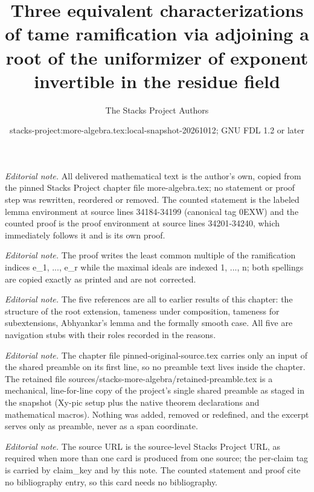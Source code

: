 \documentclass[10pt,a4paper]{amsart}
\title{Three equivalent characterizations of tame ramification via adjoining a root of the uniformizer of exponent invertible in the residue field}
\author{The Stacks Project Authors}
\date{stacks-project:more-algebra.tex:local-snapshot-20261012; GNU FDL 1.2 or later}
\theoremstyle{plain}
\theoremstyle{definition}
\theoremstyle{remark}
\numberwithin{equation}{subsection}
\begin{document}
\maketitle
\setcounter{subsection}{1}
\noindent\textit{Editorial note.} All delivered mathematical text is the author's own, copied from the pinned Stacks Project chapter file more-algebra.tex; no statement or proof step was rewritten, reordered or removed. The counted statement is the labeled lemma environment at source lines 34184-34199 (canonical tag 0EXW) and the counted proof is the proof environment at source lines 34201-34240, which immediately follows it and is its own proof.\par\medskip
\noindent\textit{Editorial note.} The proof writes the least common multiple of the ramification indices e\_1, ..., e\_r while the maximal ideals are indexed 1, ..., n; both spellings are copied exactly as printed and are not corrected.\par\medskip
\noindent\textit{Editorial note.} The five references are all to earlier results of this chapter: the structure of the root extension, tameness under composition, tameness for subextensions, Abhyankar's lemma and the formally smooth case. All five are navigation stubs with their roles recorded in the reasons.\par\medskip
\noindent\textit{Editorial note.} The chapter file pinned-original-source.tex carries only an input of the shared preamble on its first line, so no preamble text lives inside the chapter. The retained file sources/stacks-more-algebra/retained-preamble.tex is a mechanical, line-for-line copy of the project's single shared preamble as staged in the snapshot (Xy-pic setup plus the native theorem declarations and mathematical macros). Nothing was added, removed or redefined, and the excerpt serves only as preamble, never as a span coordinate.\par\medskip
\noindent\textit{Editorial note.} The source URL is the source-level Stacks Project URL, as required when more than one card is produced from one source; the per-claim tag is carried by claim\_key and by this note. The counted statement and proof cite no bibliography entry, so this card needs no bibliography.\par\medskip
\end{document}
